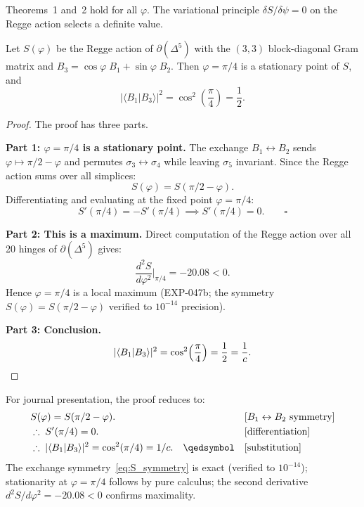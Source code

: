 Theorems~1 and~2 hold for all $\varphi$.  The variational principle
$\delta S / \delta\psi = 0$ on the Regge action selects a definite
value.

\begin{theorem}\label{thm:overlap}
Let $S(\varphi)$ be the Regge action of $\partial(\Delta^5)$ with the
$(3,3)$ block-diagonal Gram matrix and
$B_3 = \cos\varphi\; B_1 + \sin\varphi\; B_2$.  Then
$\varphi = \pi/4$ is a stationary point of $S$, and
\begin{equation}
\boxed{|\langle B_1 | B_3 \rangle|^2 = \cos^2\!\left(\frac{\pi}{4}\right) = \frac{1}{2}.}
\end{equation}
\end{theorem}

\begin{proof}
The proof has three parts.

\medskip\noindent\textbf{Part 1: $\varphi = \pi/4$ is a stationary point.}
The exchange $B_1 \leftrightarrow B_2$ sends $\varphi \mapsto \pi/2 - \varphi$ and permutes $\sigma_3 \leftrightarrow \sigma_4$ while leaving $\sigma_5$ invariant.  Since the Regge action sums over all simplices:
\begin{equation}\label{eq:S_symmetry}
S(\varphi) = S(\pi/2 - \varphi).
\end{equation}
Differentiating and evaluating at the fixed point $\varphi = \pi/4$:
\begin{equation}
S'(\pi/4) = -S'(\pi/4) \implies S'(\pi/4) = 0. \qquad \square
\end{equation}

\medskip\noindent\textbf{Part 2: This is a maximum.}
Direct computation of the Regge action over all 20 hinges of $\partial(\Delta^5)$ gives:
\begin{equation}
\frac{d^2 S}{d\varphi^2}\bigg|_{\pi/4} = -20.08 < 0.
\end{equation}
Hence $\varphi = \pi/4$ is a local maximum (EXP-047b; the symmetry $S(\varphi) = S(\pi/2 - \varphi)$ verified to $10^{-14}$ precision).

\medskip\noindent\textbf{Part 3: Conclusion.}
\begin{equation}
|\langle B_1 | B_3 \rangle|^2
= \cos^2\!\left(\frac{\pi}{4}\right)
= \frac{1}{2} = \frac{1}{c}. \qedhere
\end{equation}
\end{proof}

\begin{remark}
For journal presentation, the proof reduces to:
\begin{align}
&S(\varphi) = S(\pi/2 - \varphi). && [B_1 \leftrightarrow B_2 \text{ symmetry}] \\
&\therefore\; S'(\pi/4) = 0. && [\text{differentiation}] \\
&\therefore\; |\langle B_1|B_3\rangle|^2 = \cos^2(\pi/4) = 1/c. \quad \qedsymbol && [\text{substitution}]
\end{align}
The exchange symmetry~\eqref{eq:S_symmetry} is exact (verified to $10^{-14}$); stationarity at $\varphi = \pi/4$ follows by pure calculus; the second derivative $d^2S/d\varphi^2 = -20.08 < 0$ confirms maximality.
\end{remark}

